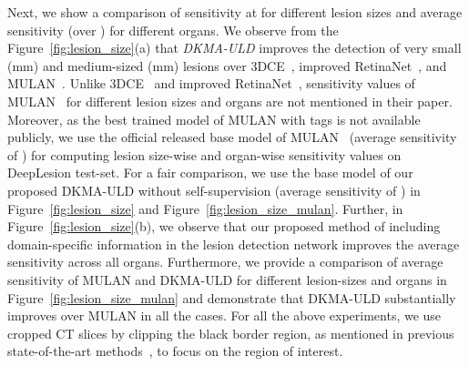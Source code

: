 \documentclass{bmvc2k}
\begin{document}
Next, we show a comparison of sensitivity at  for different lesion sizes and average sensitivity (over ) for different organs. We observe from the Figure~\ref{fig:lesion_size}(a) that \emph{DKMA-ULD} improves the detection of very small (mm) and medium-sized (mm) lesions over 3DCE~\cite{3dce}, improved RetinaNet~\cite{retinanet_improv}, and MULAN~\cite{yan2019mulan}. Unlike 3DCE~\cite{3dce} and improved RetinaNet~\cite{retinanet_improv}, sensitivity values of MULAN~\cite{yan2019mulan} for different lesion sizes and organs are not mentioned in their paper. Moreover, as the best trained model of MULAN with tags is not available publicly, we use the official released base model of MULAN~\cite{yan2019mulan} (average sensitivity of ) for computing lesion size-wise and organ-wise sensitivity values on DeepLesion test-set. For a fair comparison, we use the base model of our proposed DKMA-ULD without self-supervision (average sensitivity of ) in Figure~\ref{fig:lesion_size} and Figure~\ref{fig:lesion_size_mulan}.  Further, in Figure~\ref{fig:lesion_size}(b), we observe that our proposed method of including domain-specific information in the lesion detection network improves the average sensitivity across all organs. Furthermore, we provide a comparison of average sensitivity of MULAN and DKMA-ULD for different lesion-sizes and organs in Figure~\ref{fig:lesion_size_mulan} and demonstrate that DKMA-ULD substantially improves over MULAN in all the cases. For all the above experiments, we use cropped CT slices by clipping the black border region, as mentioned in previous state-of-the-art methods~\cite{yan2019mulan, meld}, to focus on the region of interest. 
\end{document}
